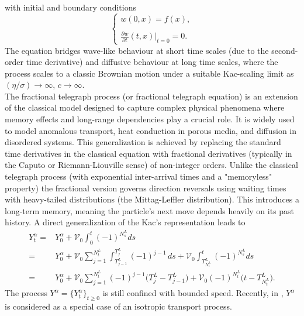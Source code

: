 \documentclass[10pt,a4paper]{article}
\numberwithin{equation}{section}
\theoremstyle{plain}
\theoremstyle{remark}
\begin{document}
with initial and boundary conditions
\begin{equation*}
\left\lbrace
\begin{array}{l}
\displaystyle w(0,x) = f(x), \\
\\
\displaystyle \frac{\partial w}{\partial t}(t, x) \bigg|_{t=0} = 0.
\end{array}
\right .
\end{equation*}
The equation bridges wave-like behaviour at short time scales (due to the second-order time derivative) and diffusive behaviour at long time scales, where the process scales to a classic Brownian motion under a suitable Kac-scaling limit as $(\eta/\sigma) \to \infty$, $c \to \infty$.\\



The fractional telegraph process (or fractional telegraph equation) is an extension of the classical model designed to capture complex physical phenomena where memory effects and long-range dependencies play a crucial role. It is widely used to model anomalous transport, heat conduction in porous media, and diffusion in disordered systems. This generalization is achieved by replacing the standard time derivatives in the classical equation with fractional derivatives (typically in the Caputo or Riemann-Liouville sense) of non-integer orders. Unlike the classical telegraph process (with exponential inter-arrival times and a "memoryless" property) the fractional version governs direction reversals using waiting times with heavy-tailed distributions (the Mittag-Leffler distribution). This introduces a long-term memory, meaning the particle's next move depends heavily on its past history. A direct generalization of the Kac's representation leads to
\begin{align*}
Y^\alpha_t
= & Y^\alpha_0 + \mathcal{V}_0 \int_0^t (-1)^{N^L_s} ds\\
= & Y^\alpha_0 + \mathcal{V}_0 \sum_{j=1}^{N^L_t} \int_{T^L_{j-1}}^{T^L_j} (-1)^{j-1}\, ds + \mathcal{V}_0 \int_{T^L_{N^L_t}}^t (-1)^{N^L_s} ds\\
= & Y^\alpha_0 + \mathcal{V}_0 \sum_{j=1}^{N^L_t} (-1)^{j-1} \big(T^L_j - T^L_{j-1} \big)  + \mathcal{V}_0 (-1)^{N^L_t} \big( t - T^L_{N^L_t} \big).
\end{align*}
The process $Y^\alpha=\{Y^\alpha_t\}_{t \geq 0}$ is still confined with bounded speed. Recently, in \cite[Section 5.3]{ToaRic}, $Y^\alpha$ is considered as a special case of an isotropic transport process.
\end{document}
